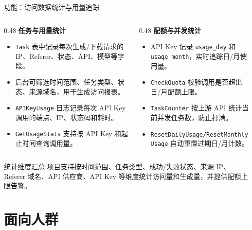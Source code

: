 \documentclass[aspectratio=169,UTF8]{ctexbeamer}
\newcommand{\code}[1]{\texttt{#1}}
\begin{document}
\begin{frame}{功能：访问数据统计与用量追踪}
  \begin{columns}[T]
    \begin{column}{0.48\linewidth}
      \textbf{任务与用量统计}
      \begin{itemize}
        \item \code{Task} 表中记录每次生成/下载请求的 IP、Referer、状态、API、模型等字段。
        \item 后台可筛选时间范围、任务类型、状态、来源域名，用于生成访问报表。
        \item \code{APIKeyUsage} 日志记录每次 API Key 调用的端点、IP、状态码和耗时。
        \item \code{GetUsageStats} 支持按 API Key 和起止时间查询调用量。
      \end{itemize}
    \end{column}
    \begin{column}{0.48\linewidth}
      \textbf{配额与并发统计}
      \begin{itemize}
        \item API Key 记录 \code{usage\_day} 和 \code{usage\_month}，实时追踪日/月使用量。
        \item \code{CheckQuota} 校验调用是否超出日/月配额上限。
        \item \code{TaskCounter} 按上游 API 统计当前并发任务数，防止打满。
        \item \code{ResetDailyUsage/ResetMonthlyUsage} 自动重置过期日/月计数。
      \end{itemize}
    \end{column}
  \end{columns}

  \vspace{0.3cm}
  \begin{block}{统计维度汇总}
    项目支持按时间范围、任务类型、成功/失败状态、来源 IP、Referer 域名、API 供应商、API Key 等维度统计访问量和生成量，并提供配额上限告警。
  \end{block}
\end{frame}

\section{面向人群}
\end{document}
